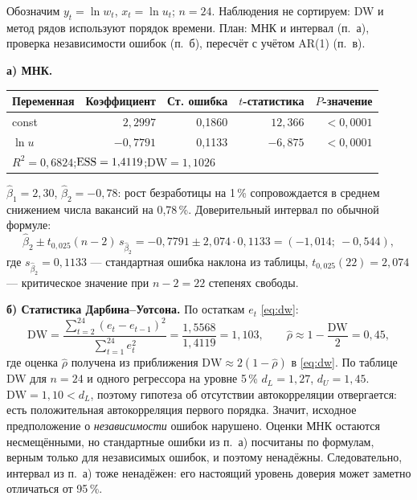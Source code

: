 \begin{solution}
Обозначим $y_t=\ln w_t$, $x_t=\ln u_t$; $n=24$. Наблюдения не сортируем:
DW и метод рядов используют порядок времени. План: МНК и интервал (п.~а),
проверка независимости ошибок (п.~б), пересчёт с учётом AR(1) (п.~в).

\medskip
\textbf{а) МНК.}
\begin{center}
\begin{tabular*}{\linewidth}{@{\extracolsep{\fill}}lrrrr@{}}
\toprule
Переменная & Коэффициент & Ст. ошибка & $t$-статистика & $P$-значение \\
\midrule
const   & $\phantom{-}2{,}2997$ & 0,1860 & $12{,}366$ & $<0{,}0001$ \\
$\ln u$ & $-0{,}7791$ & 0,1133 & $-6{,}875$ & $<0{,}0001$ \\
\midrule
\multicolumn{5}{l}{$R^2 = 0{,}6824$;\quad $\mathrm{ESS} = 1{,}4119$;\quad $\mathrm{DW} = 1{,}1026$} \\
\bottomrule
\end{tabular*}
\end{center}
$\widehat{\beta}_1 = 2{,}30$, $\widehat{\beta}_2 = -0{,}78$: рост безработицы
на 1\,\% сопровождается в среднем снижением числа вакансий на 0,78\,\%.
Доверительный интервал по обычной формуле:
\[
  \widehat{\beta}_2 \pm t_{0{,}025}(n-2)\,s_{\widehat{\beta}_2}
  = -0{,}7791 \pm 2{,}074\cdot 0{,}1133 = (-1{,}014;\ -0{,}544),
\]
где $s_{\widehat\beta_2} = 0{,}1133$ — стандартная ошибка наклона из
таблицы, $t_{0{,}025}(22) = 2{,}074$ — критическое значение при
$n - 2 = 22$ степенях свободы.

\medskip
\textbf{б) Статистика Дарбина--Уотсона.} По остаткам $e_t$ \eqref{eq:dw}:
\[
  \mathrm{DW} = \frac{\sum_{t=2}^{24}(e_t - e_{t-1})^2}{\sum_{t=1}^{24}e_t^2}
              = \frac{1{,}5568}{1{,}4119} = 1{,}103,
  \qquad
  \widehat{\rho} \approx 1 - \frac{\mathrm{DW}}{2} = 0{,}45 ,
\]
где оценка $\widehat\rho$ получена из приближения
$\mathrm{DW} \approx 2(1 - \widehat\rho)$ в \eqref{eq:dw}. По таблице DW
для $n = 24$ и одного регрессора на уровне 5\,\% $d_L = 1{,}27$,
$d_U = 1{,}45$. $\mathrm{DW} = 1{,}10 < d_L$, поэтому гипотеза об отсутствии
автокорреляции отвергается: есть положительная автокорреляция первого
порядка. Значит, исходное предположение о \emph{независимости} ошибок
нарушено. Оценки МНК остаются несмещёнными, но стандартные ошибки из п.~а)
посчитаны по формулам, верным только для независимых ошибок, и поэтому
ненадёжны. Следовательно, интервал из п.~а) тоже ненадёжен: его настоящий
уровень доверия может заметно отличаться от 95\,\%.


\end{solution}
